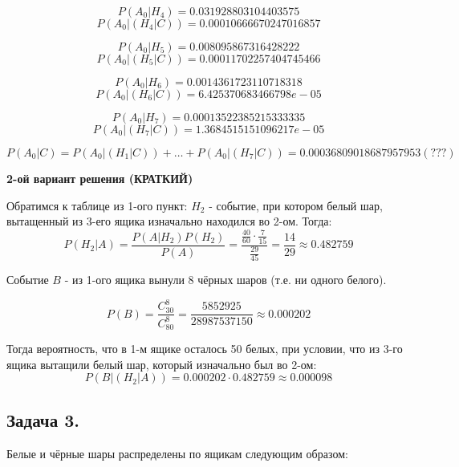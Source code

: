 \begin{enumerate}
	\[ P(A_0|H_4) = 0.031928803104403575 \]
	\[ P(A_0|(H_4|C)) = 0.00010666670247016857 \]
	
	\[ P(A_0|H_5) = 0.008095867316428222 \]
	\[ P(A_0|(H_5|C)) = 0.00011702257404745466 \]
	
	\[ P(A_0|H_6) = 0.0014361723110718318 \]
	\[ P(A_0|(H_6|C)) = 6.425370683466798e-05 \]
	
	\[ P(A_0|H_7) = 0.00013522385215333335 \]
	\[ P(A_0|(H_7|C)) = 1.3684515151096217e-05 \]
	
	\[ P(A_0|C) = P(A_0|(H_1|C)) + \dots + P(A_0|(H_7|C)) = 0.00036809018687957953 (\textbf{???}) \]
	
	\textbf{2-ой вариант решения (КРАТКИЙ)}

	Обратимся к таблице из 1-ого пункт: $H_2$ - событие, при котором белый шар, вытащенный из 3-его ящика изначально находился во 2-ом. Тогда:
	\[ P(H_2|A) = \dfrac{P(A|H_2)P(H_2)}{P(A)} = \dfrac{\frac{40}{60} \cdot \frac{7}{15}}{\frac{29}{45}} = \dfrac{14}{29} \approx 0.482759 \]
	
	Событие $B$ - из 1-ого ящика вынули 8 чёрных шаров (т.е. ни одного белого).
	
	\[ P(B) = \dfrac{C_{30}^8}{C_{80}^8} = \dfrac{5852925}{28987537150} \approx 0.000202 \]
	
	Тогда вероятность, что в 1-м ящике осталось 50 белых, при условии, что из 3-го ящика вытащили белый шар, который изначально был во 2-ом:
	\[ P(B|(H_2|A)) = 0.000202 \cdot 0.482759 \approx 0.000098 \]
\end{enumerate}

\subsection*{Задача 3.}

Белые и чёрные шары распределены по ящикам следующим образом:

\begin{figure}[H]
\end{figure}

